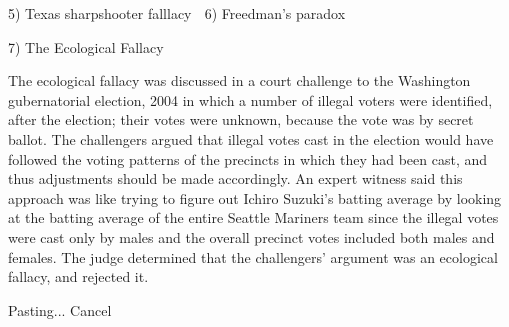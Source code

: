 5) Texas sharpshooter falllacy

6) Freedman's paradox


7) The Ecological Fallacy
 

The ecological fallacy was discussed in a court challenge to the Washington
gubernatorial election, 2004 in which a number of illegal voters were identified,
after the election; their votes were unknown, because the vote was
by secret ballot. The challengers argued that illegal votes cast in
the election would have followed the voting patterns of the precincts
in which they had been cast, and thus adjustments should be made accordingly.
An expert witness said this approach was like trying to figure out Ichiro Suzuki's
batting average by looking at the batting average of the entire Seattle Mariners
team since the illegal votes were cast only by males and the overall precinct votes
included both males and females.
The judge determined that the challengers' argument was an ecological fallacy, and rejected it.


Pasting... Cancel
